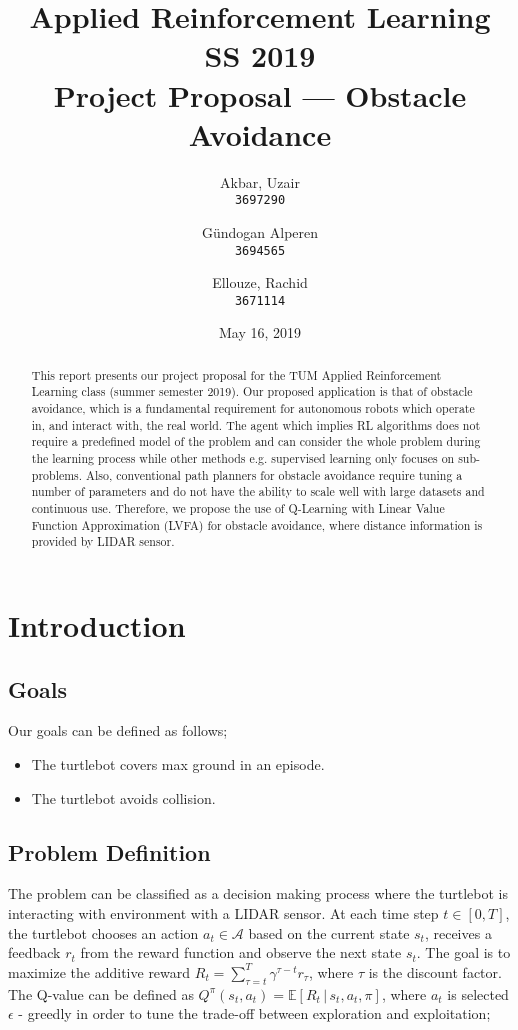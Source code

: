 \documentclass{article}
\title{Applied Reinforcement Learning\\
        \vspace{-0.10cm}
        {\large SS 2019}\\
        \vspace{0.0cm}
        {Project Proposal --- Obstacle Avoidance}}
\author{
  \small Akbar, Uzair\\
  \small \texttt{3697290}
  \and
  \small G\"undogan Alperen\\
  \small \texttt{3694565}
  \and
  \small Ellouze, Rachid \\
  \small \texttt{3671114}
}
\date{May 16, 2019}
\begin{document}
\begin{titlingpage}
    \maketitle
    \begin{abstract}
        This report presents our project proposal for the TUM Applied Reinforcement Learning class (summer semester 2019). Our proposed application is that of obstacle avoidance, which is a fundamental requirement for autonomous robots which operate in, and interact with, the real world. The agent which implies RL algorithms does not require a predefined model of the problem and can consider the whole problem during the learning process while other methods e.g. supervised learning only focuses on sub-problems. Also, conventional path planners for obstacle avoidance require tuning a number of parameters and do not have the ability to scale well with large datasets and continuous use. Therefore, we propose the use of Q-Learning with Linear Value Function Approximation (LVFA) for obstacle avoidance, where distance information is provided by LIDAR sensor. %
    \end{abstract}
    \tableofcontents
\end{titlingpage}


\section{Introduction}
\subsection{Goals}
Our goals can be defined as follows;
\begin{itemize}
\item The turtlebot covers max ground in an episode.
\item The turtlebot avoids collision.
\end{itemize}

\subsection{Problem Definition}
The problem can be classified as a decision making process where the turtlebot is interacting with environment with a LIDAR sensor. At each time step $t \in [0, T]$, the turtlebot chooses an action $a_t \in \mathcal{A}$ based on the current state $s_t$, receives a feedback $r_t$ from the reward function and observe the next state $s_t$. The goal is to maximize the additive reward $R_t = \sum_{\tau=t}^{T}\gamma^{\tau-t}r_{\tau}$, where $\tau$ is the discount factor. The Q-value can be defined as $ Q^{\pi}(s_t, a_t)= \mathbb{E}[R_t\,\vert\,s_t,a_t,\pi]$, where $a_t$ is selected $\epsilon$ - greedly in order to tune the trade-off between exploration and exploitation;
\end{document}
